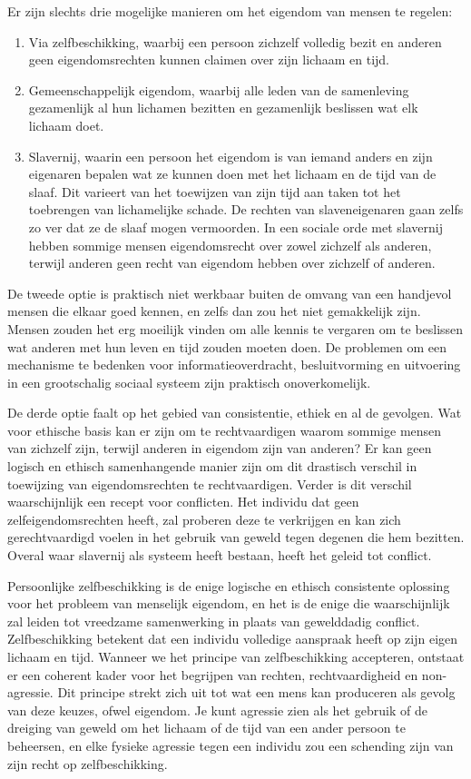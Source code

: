 \documentclass[
  a5paper,
  smalldemyvopaper,11pt,twoside,onecolumn,openright,extrafontsizes,
hidelinks]{memoir}
\begin{document}
Er zijn slechts drie mogelijke manieren om het eigendom van mensen te
regelen:

\begin{enumerate}
\def\labelenumi{\arabic{enumi}.}
\item
  Via zelfbeschikking, waarbij een persoon zichzelf volledig bezit en
  anderen geen eigendomsrechten kunnen claimen over zijn lichaam en
  tijd.
\item
  Gemeenschappelijk eigendom, waarbij alle leden van de samenleving
  gezamenlijk al hun lichamen bezitten en gezamenlijk beslissen wat elk
  lichaam doet.
\item
  Slavernij, waarin een persoon het eigendom is van iemand anders en
  zijn eigenaren bepalen wat ze kunnen doen met het lichaam en de tijd
  van de slaaf. Dit varieert van het toewijzen van zijn tijd aan taken
  tot het toebrengen van lichamelijke schade. De rechten van
  slaveneigenaren gaan zelfs zo ver dat ze de slaaf mogen vermoorden. In
  een sociale orde met slavernij hebben sommige mensen eigendomsrecht
  over zowel zichzelf als anderen, terwijl anderen geen recht van
  eigendom hebben over zichzelf of anderen.
\end{enumerate}

De tweede optie is praktisch niet werkbaar buiten de omvang van een
handjevol mensen die elkaar goed kennen, en zelfs dan zou het niet
gemakkelijk zijn. Mensen zouden het erg moeilijk vinden om alle kennis
te vergaren om te beslissen wat anderen met hun leven en tijd zouden
moeten doen. De problemen om een mechanisme te bedenken voor
informatieoverdracht, besluitvorming en uitvoering in een grootschalig
sociaal systeem zijn praktisch onoverkomelijk.

De derde optie faalt op het gebied van consistentie, ethiek en al de
gevolgen. Wat voor ethische basis kan er zijn om te rechtvaardigen
waarom sommige mensen van zichzelf zijn, terwijl anderen in eigendom
zijn van anderen? Er kan geen logisch en ethisch samenhangende manier
zijn om dit drastisch verschil in toewijzing van eigendomsrechten te
rechtvaardigen. Verder is dit verschil waarschijnlijk een recept voor
conflicten. Het individu dat geen zelfeigendomsrechten heeft, zal
proberen deze te verkrijgen en kan zich gerechtvaardigd voelen in het
gebruik van geweld tegen degenen die hem bezitten. Overal waar slavernij
als systeem heeft bestaan, heeft het geleid tot conflict.

Persoonlijke zelfbeschikking is de enige logische en ethisch consistente
oplossing voor het probleem van menselijk eigendom, en het is de enige
die waarschijnlijk zal leiden tot vreedzame samenwerking in plaats van
gewelddadig conflict. Zelfbeschikking betekent dat een individu
volledige aanspraak heeft op zijn eigen lichaam en tijd. Wanneer we het
principe van zelfbeschikking accepteren, ontstaat er een coherent kader
voor het begrijpen van rechten, rechtvaardigheid en non-agressie. Dit
principe strekt zich uit tot wat een mens kan produceren als gevolg van
deze keuzes, ofwel eigendom. Je kunt agressie zien als het gebruik of de
dreiging van geweld om het lichaam of de tijd van een ander persoon te
beheersen, en elke fysieke agressie tegen een individu zou een schending
zijn van zijn recht op zelfbeschikking.
\end{document}
